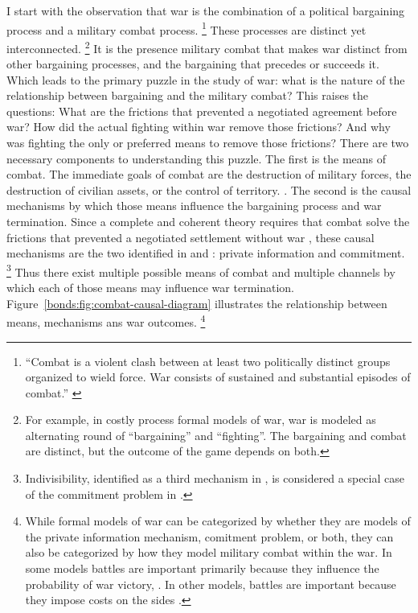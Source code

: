 I start with the observation that war is the combination of a political bargaining process and a military combat process. %
\footnote{%
  ``Combat is a violent clash between at least two politically
  distinct groups organized to wield force. War consists of sustained
  and substantial episodes of combat.'' \parencite{Reiter2003} %
} %
These processes are distinct yet interconnected.%
\footnote{%
  For example, in costly process formal models of war, war is modeled
  as alternating round of ``bargaining'' and ``fighting''. %
  The bargaining and combat are distinct, but the outcome of the game
  depends on both. %
} %
It is the presence military combat that makes war distinct from other bargaining processes, and the bargaining that precedes or succeeds it. %
Which leads to the primary puzzle in the study of war: what is the nature of the relationship between bargaining and the military combat?
This raises the questions:
What are the frictions that prevented a negotiated agreement before war?
How did the actual fighting within war remove those frictions?
And why was fighting the only or preferred means to remove those frictions?
There are two necessary components to understanding this puzzle. %
The first is the means of combat. %
The immediate goals of combat are the destruction of military forces, the destruction of civilian assets, or the control of territory.
\parencite[30]{Reiter2003}. %
The second is the causal mechanisms by which those means influence the bargaining process and war termination. %
Since a complete and coherent theory requires that combat solve the frictions that prevented a negotiated settlement without war \parencite{LeventogluSlantchev2007}, these causal mechanisms are the two identified in \textcite{Fearon1995} and \textcite{Powell2006}: private information and commitment.%
\footnote{Indivisibility, identified as a third mechanism in \textcite{Fearon1995}, is considered a special case of the commitment problem in \textcite{Powell2006}.}
Thus there exist multiple possible means of combat and multiple channels by which each of those means may influence war termination.
Figure~\ref{bonds:fig:combat-causal-diagram} illustrates the relationship between means, mechanisms ans war outcomes.%
\footnote{
While formal models of war can be categorized by whether they are models of the private information mechanism, comitment problem, or both, they can also be categorized by how they model military combat within the war.
In some models battles are important primarily because they influence the probability of war victory, \parencites{Powell2004}{Wagner2000}{LeventogluSlantchev2007}{Slantchev2003}{SmithStam2004}.
In other models, battles are important because they impose costs on the sides \parencites{FilsonWerner2002}{Powell2004}{LeventogluSlantchev2007}. %
}

